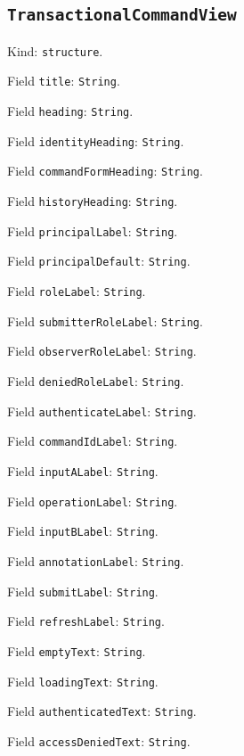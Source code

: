 \documentclass[11pt]{article}
\begin{document}
\subsection*{\texttt{TransactionalCommandView}}
\noindent Kind: \texttt{structure}.\par
\noindent Field \texttt{title}: \texttt{String}.\par
\noindent Field \texttt{heading}: \texttt{String}.\par
\noindent Field \texttt{identityHeading}: \texttt{String}.\par
\noindent Field \texttt{commandFormHeading}: \texttt{String}.\par
\noindent Field \texttt{historyHeading}: \texttt{String}.\par
\noindent Field \texttt{principalLabel}: \texttt{String}.\par
\noindent Field \texttt{principalDefault}: \texttt{String}.\par
\noindent Field \texttt{roleLabel}: \texttt{String}.\par
\noindent Field \texttt{submitterRoleLabel}: \texttt{String}.\par
\noindent Field \texttt{observerRoleLabel}: \texttt{String}.\par
\noindent Field \texttt{deniedRoleLabel}: \texttt{String}.\par
\noindent Field \texttt{authenticateLabel}: \texttt{String}.\par
\noindent Field \texttt{commandIdLabel}: \texttt{String}.\par
\noindent Field \texttt{inputALabel}: \texttt{String}.\par
\noindent Field \texttt{operationLabel}: \texttt{String}.\par
\noindent Field \texttt{inputBLabel}: \texttt{String}.\par
\noindent Field \texttt{annotationLabel}: \texttt{String}.\par
\noindent Field \texttt{submitLabel}: \texttt{String}.\par
\noindent Field \texttt{refreshLabel}: \texttt{String}.\par
\noindent Field \texttt{emptyText}: \texttt{String}.\par
\noindent Field \texttt{loadingText}: \texttt{String}.\par
\noindent Field \texttt{authenticatedText}: \texttt{String}.\par
\noindent Field \texttt{accessDeniedText}: \texttt{String}.\par
\end{document}
